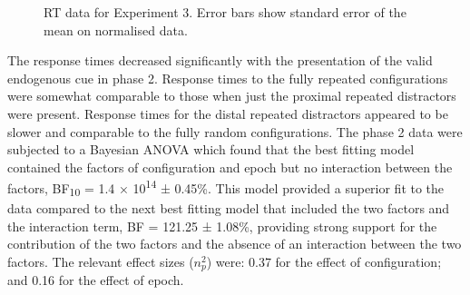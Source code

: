 \documentclass[
  man,
  floatsintext,
  longtable,
  nolmodern,
  notxfonts,
  notimes,
  colorlinks=true,linkcolor=blue,citecolor=blue,urlcolor=blue]{apa7}
\begin{document}
\begin{figure}[H]


\caption{\label{fig-RT-exp3}RT data for Experiment 3. Error bars show
standard error of the mean on normalised data.}

\end{figure}%

The response times decreased significantly with the presentation of the
valid endogenous cue in phase 2. Response times to the fully repeated
configurations were somewhat comparable to those when just the proximal
repeated distractors were present. Response times for the distal
repeated distractors appeared to be slower and comparable to the fully
random configurations. The phase 2 data were subjected to a Bayesian
ANOVA which found that the best fitting model contained the factors of
configuration and epoch but no interaction between the factors,
BF\textsubscript{10} = 1.4 × 10\textsuperscript{14} ± 0.45\%. This model
provided a superior fit to the data compared to the next best fitting
model that included the two factors and the interaction term, BF =
121.25 ± 1.08\%, providing strong support for the contribution of the
two factors and the absence of an interaction between the two factors.
The relevant effect sizes (\(n^2_p\)) were: 0.37 for the effect of
configuration; and 0.16 for the effect of epoch.
\end{document}
